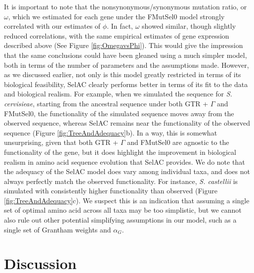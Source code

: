 \documentclass{article}
\newcommand{\selac}{SelAC\xspace}
\newcommand{\alphag}{\ensuremath{\alpha_G}\xspace}
\begin{document}
It is important to note that the nonsynonymous/synonymous mutation ratio, or $\omega$, which we estimated for each gene under the FMutSel0 model strongly correlated with our estimates of $\phi$.
In fact, $\omega$ showed similar, though slightly reduced correlations, with the same empirical estimates of gene expression described above (See Figure \ref{fig:OmegavsPhi}).
This would give the impression that the same conclusions could have been gleaned using a much simpler model, both in terms of the number of parameters and the assumptions made.
However, as we discussed earlier, not only is this model greatly restricted in terms of its biological feasibility, \selac clearly performs better in terms of its fit to the data and biological realism.
For example, when we simulated the sequence for \emph{S. cervisieae}, starting from the ancestral sequence under both GTR + $\Gamma$ and FMutSel0, the functionality of the simulated sequence moves away from the observed sequence, whereas SelAC remains near the functionality of the observed sequence (Figure \ref{fig:TreeAndAdequacy}b).
In a way, this is somewhat unsurprising, given that both GTR + $\Gamma$ and FMutSel0 are agnostic to the functionality of the gene, but it does highlight the improvement in biological realism in amino acid sequence evolution that \selac provides.
We do note that the adequacy of the SelAC model does vary among individual taxa, and does not always perfectly match the observed functionality.
For instance, \emph{S. castellii} is simulated with consistently higher functionality than observed (Figure \ref{fig:TreeAndAdequacy}c).
We suspect this is an indication that assuming a single set of optimal amino acid across all taxa may be too simplistic, but we cannot also rule out other potential simplifying assumptions in our model, such as a single set of Grantham weights and $\alphag$.


\section*{Discussion}
\end{document}
